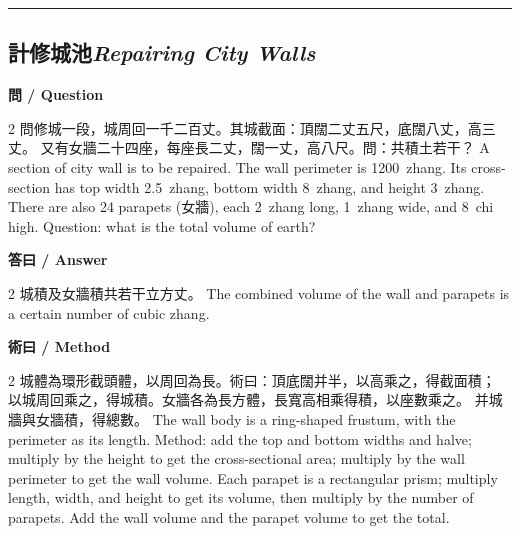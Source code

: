 \documentclass[11pt,a4paper]{article}
\newcommand{\bilingualsubsection}[2]{\subsection{#1\quad\textit{#2}}}
\newcommand{\longline}{\noindent\rule{\textwidth}{0.4pt}}
\begin{document}
\vspace{0.5em}
\longline

\bilingualsubsection{計修城池}{Repairing City Walls}

\vspace{0.4em}
\noindent\textbf{\textcolor{chinesecolor}{問} / \textcolor{englishcolor}{Question}}
\vspace{0.3em}
\begin{paracol}{2}
問修城一段，城周回一千二百丈。其城截面：頂闊二丈五尺，底闊八丈，高三丈。
又有女牆二十四座，每座長二丈，闊一丈，高八尺。問：共積土若干？
\switchcolumn
A section of city wall is to be repaired. The wall perimeter is 1200~zhang.
Its cross-section has top width 2.5~zhang, bottom width 8~zhang, and height
3~zhang. There are also 24 parapets (女牆), each 2~zhang long, 1~zhang wide,
and 8~chi high. Question: what is the total volume of earth?
\end{paracol}

\vspace{0.4em}
\noindent\textbf{\textcolor{chinesecolor}{答曰} / \textcolor{englishcolor}{Answer}}
\vspace{0.2em}
\begin{paracol}{2}
城積及女牆積共若干立方丈。
\switchcolumn
The combined volume of the wall and parapets is a certain number of cubic zhang.
\end{paracol}

\vspace{0.4em}
\noindent\textbf{\textcolor{chinesecolor}{術曰} / \textcolor{englishcolor}{Method}}
\vspace{0.2em}
\begin{paracol}{2}
城體為環形截頭體，以周回為長。術曰：頂底闊并半，以高乘之，得截面積；
以城周回乘之，得城積。女牆各為長方體，長寬高相乘得積，以座數乘之。
并城牆與女牆積，得總數。
\switchcolumn
The wall body is a ring-shaped frustum, with the perimeter as its length.
Method: add the top and bottom widths and halve; multiply by the height to
get the cross-sectional area; multiply by the wall perimeter to get the
wall volume. Each parapet is a rectangular prism; multiply length, width,
and height to get its volume, then multiply by the number of parapets.
Add the wall volume and the parapet volume to get the total.
\end{paracol}
\end{document}
